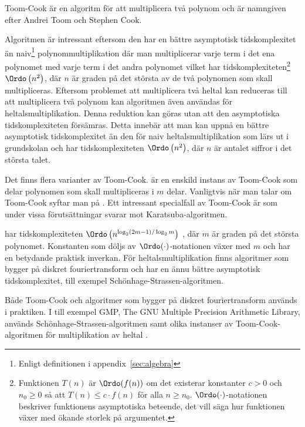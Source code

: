 Toom-Cook är en algoritm för att multiplicera två polynom och är namngiven efter
Andrei Toom och Stephen Cook.

Algoritmen är intressant eftersom den har en bättre asymptotisk tidskomplexitet
än naiv\footnote{Enligt definitionen i appendix~\ref{sec:algebra}}
polynommultiplikation där man multiplicerar varje term i det ena polynomet med
varje term i det andra polynomet vilket har
tidskomplexiteten\footnote{Funktionen $T(n)$ är $\Ordo(f(n))$ om det existerar
konstanter $c > 0$ och $n_0 \geq 0$ så att $T(n) \leq c \cdot f(n)$ för alla $n
\geq n_0$. $\Ordo(\cdot )$-notationen beskriver funktionens asymptotiska
beteende, det vill säga hur funktionen växer med ökande storlek på argumentet.}
$\Ordo\left(n^2\right)$, där $n$ är graden på det största av de två polynomen
som skall multipliceras. Eftersom problemet att multiplicera två heltal kan
reduceras till att multiplicera två polynom kan algoritmen även användas för
heltalsmultiplikation. Denna reduktion kan göras utan att den asymptotiska
tidskomplexiteten försämras. Detta innebär att man kan uppnå en bättre
asymptotisk tidskomplexitet än den för naiv heltalsmultiplikation som lärs ut i
grundskolan och har tidskomplexiteten $\Ordo\left(n^2\right)$, där $n$ är
antalet siffror i det största talet.

Det finns flera varianter av Toom-Cook.  är en enskild instans av
Toom-Cook som delar polynomen som skall multipliceras i $m$ delar. Vanligtvis
när man talar om Toom-Cook syftar man på . Ett intressant specialfall
av Toom-Cook är  som under vissa förutsättningar svarar mot
Karatsuba-algoritmen.

 har tidskomplexiteten $\Ordo \left(n^{\log_2(2 m-1)/\log_2 m}\right)$
\cite{bodrato2007towards}, där $m$ är graden på det största polynomet.
Konstanten som döljs av $\Ordo(\cdot)$-notationen växer med $m$ och har en
betydande praktisk inverkan. För heltalsmultiplikation finns algoritmer som
bygger på diskret fouriertransform och har en ännu bättre asymptotisk
tidskomplexitet, till exempel Schönhage-Strassen-algoritmen.

Både Toom-Cook och algoritmer som bygger på diskret fouriertransform används i
praktiken. I till exempel GMP, The GNU Multiple Precision Arithmetic Library,
används Schönhage-Strassen-algoritmen samt olika instanser av
Toom-Cook-algoritmen för multiplikation av heltal \cite{gmpdoc}.
